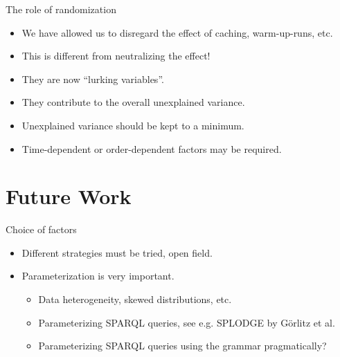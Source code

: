 \documentclass[english,handout,aspectratio=169]{ifislide}
\begin{document}
\begin{frame}{The role of randomization}
  \begin{itemize}
  \item We have allowed us to disregard the effect of caching,
    warm-up-runs, etc.
  \item This is different from neutralizing the effect!
  \item They are now ``lurking variables''.
  \item They contribute to the overall unexplained variance.
  \item Unexplained variance should be kept to a minimum.
  \item Time-dependent or order-dependent factors may be required.
  \end{itemize}
\end{frame}

\section{Future Work}

\begin{frame}{Choice of factors}

  \begin{itemize}
  \item Different strategies must be tried, open field.
  \item Parameterization is very important.
    \begin{itemize}
    \item Data heterogeneity, skewed distributions, etc.
    \item Parameterizing SPARQL queries, see e.g. SPLODGE by Görlitz
      et al.
    \item Parameterizing SPARQL queries using the grammar pragmatically?
    \end{itemize}
  \end{itemize}
  
\end{frame}
\end{document}
